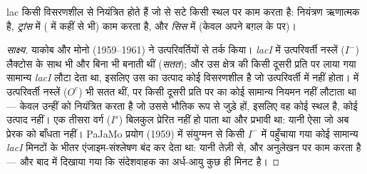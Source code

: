 \begin{proposition}[ऑपेरॉन मॉडल]\label{prop:b1:expression-control:jacobmonod}
lac  किसी विसरणशील  से नियंत्रित होते हैं जो  से सटे किसी
स्थल पर काम करता है: नियंत्रण ऋणात्मक है,  \emph{ट्रांस} में
( में कहीं से भी) काम करता है, और  \emph{सिस} में
(केवल अपने बग़ल के  पर)।
\end{proposition}
\begin{proof}[साक्ष्य]
याकोब और मोनो (1959--1961) ने उत्परिवर्तियों से तर्क किया।
\emph{lacI} में उत्परिवर्ती नस्लें ($I^-$) लैक्टोस के साथ भी और बिना भी
 बनाती थीं (\emph{सतत}); और उस क्षेत्र की किसी दूसरी प्रति पर लाया
गया सामान्य \emph{lacI}  लौटा देता था, इसलिए उस  का उत्पाद
कोई विसरणशील  है जो उत्परिवर्ती में नहीं होता।  में
उत्परिवर्ती नस्लें ($O^c$) भी सतत थीं, पर किसी दूसरी प्रति पर का कोई
सामान्य  नियमन नहीं लौटाता था ---  केवल उन्हीं  को
नियंत्रित करता है जो उससे भौतिक रूप से जुड़े हों, इसलिए वह कोई स्थल है,
कोई उत्पाद नहीं। एक तीसरा वर्ग ($I^s$) बिलकुल प्रेरित नहीं हो पाता था
और प्रभावी था: यानी ऐसा  जो अब प्रेरक को बाँधता नहीं। PaJaMo
प्रयोग (1959) में संयुग्मन से किसी $I^-$  में पहुँचाया गया कोई
सामान्य \emph{lacI}  मिनटों के भीतर एंजाइम-संश्लेषण बंद कर देता था:
यानी  तेज़ी से, और अनुलेखन पर काम करता है --- और बाद में दिखाया
गया कि संदेशवाहक का अर्ध-आयु कुछ ही मिनट है।
\end{proof}

